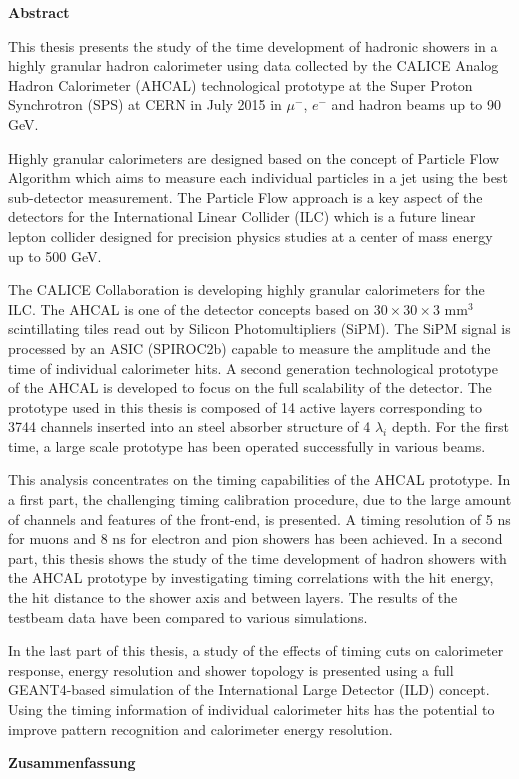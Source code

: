 \cleardoublepage
{}
{}

\thispagestyle{empty}
\begin{center}
{\bf Abstract}
\end{center}

This thesis presents the study of the time development of hadronic showers in a highly granular hadron calorimeter using data collected by the CALICE Analog Hadron Calorimeter (AHCAL) technological prototype at the Super Proton Synchrotron (SPS) at CERN in July 2015 in $\mu^-$, $e^-$ and hadron beams up to 90 GeV.

Highly granular calorimeters are designed based on the concept of Particle Flow Algorithm which aims to measure each individual particles in a jet using the best sub-detector measurement. The Particle Flow approach is a key aspect of the detectors for the International Linear Collider (ILC) which is a future linear lepton collider designed for precision physics studies at a center of mass energy up to 500 GeV.

The CALICE Collaboration is developing highly granular calorimeters for the ILC. The AHCAL is one of the detector concepts based on $30\times30\times3$ mm$^3$ scintillating tiles read out by Silicon Photomultipliers (SiPM). The SiPM signal is processed by an ASIC (SPIROC2b) capable to measure the amplitude and the time of individual calorimeter hits. A second generation technological prototype of the AHCAL is developed to focus on the full scalability of the detector. The prototype used in this thesis is composed of 14 active layers corresponding to 3744 channels inserted into an steel absorber structure of 4 $\lambda_i$ depth. For the first time, a large scale prototype has been operated successfully in various beams.

This analysis concentrates on the timing capabilities of the AHCAL prototype. In a first part, the challenging timing calibration procedure, due to the large amount of channels and features of the front-end, is presented. A timing resolution of 5 ns for muons and 8 ns for electron and pion showers has been achieved. In a second part, this thesis shows the study of the time development of hadron showers with the AHCAL prototype by investigating timing correlations with the hit energy, the hit distance to the shower axis and between layers. The results of the testbeam data have been compared to various simulations.

In the last part of this thesis, a study of the effects of timing cuts on calorimeter response, energy resolution and shower topology is presented using a full GEANT4-based simulation of the International Large Detector (ILD) concept. Using the timing information of individual calorimeter hits has the potential to improve pattern recognition and calorimeter energy resolution.

\newpage
\thispagestyle{empty}
\begin{center}
{\bf Zusammenfassung}
\end{center}
\lipsum[23]
